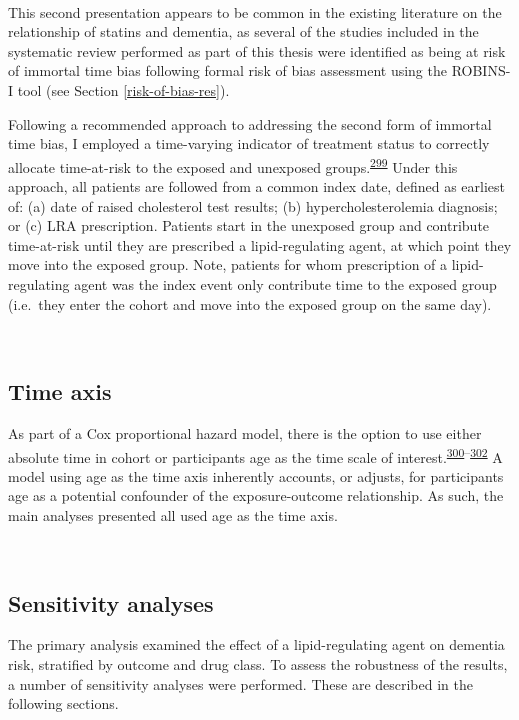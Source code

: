 \documentclass[a4paper, twoside]{templates/ociamthesis}
\begin{document}
~

This second presentation appears to be common in the existing literature on the relationship of statins and dementia, as several of the studies included in the systematic review performed as part of this thesis were identified as being at risk of immortal time bias following formal risk of bias assessment using the ROBINS-I tool (see Section \ref{risk-of-bias-res}).

Following a recommended approach to addressing the second form of immortal time bias, I employed a time-varying indicator of treatment status to correctly allocate time-at-risk to the exposed and unexposed groups.\textsuperscript{\protect\hyperlink{ref-levesque2010}{299}} Under this approach, all patients are followed from a common index date, defined as earliest of: (a) date of raised cholesterol test results; (b) hypercholesterolemia diagnosis; or (c) LRA prescription. Patients start in the unexposed group and contribute time-at-risk until they are prescribed a lipid-regulating agent, at which point they move into the exposed group. Note, patients for whom prescription of a lipid-regulating agent was the index event only contribute time to the exposed group (i.e.~they enter the cohort and move into the exposed group on the same day).

~

\hypertarget{cprd-time-axis}{%
\subsection{Time axis}\label{cprd-time-axis}}

As part of a Cox proportional hazard model, there is the option to use either absolute time in cohort or participants age as the time scale of interest.\textsuperscript{\protect\hyperlink{ref-lamarca1998}{300}--\protect\hyperlink{ref-pencina2007}{302}} A model using age as the time axis inherently accounts, or adjusts, for participants age as a potential confounder of the exposure-outcome relationship. As such, the main analyses presented all used age as the time axis.

~

\hypertarget{sensitivity-analyses}{%
\subsection{Sensitivity analyses}\label{sensitivity-analyses}}

The primary analysis examined the effect of a lipid-regulating agent on dementia risk, stratified by outcome and drug class. To assess the robustness of the results, a number of sensitivity analyses were performed. These are described in the following sections.
\end{document}
